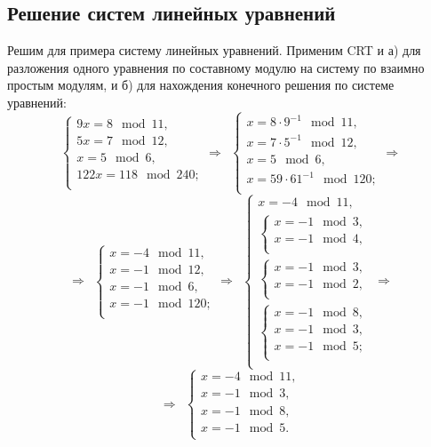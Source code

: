 \subsection[Решение систем линейных уравнений]{Решение систем линейных уравнений}

\example
Решим для примера систему линейных уравнений. Применим CRT и а) для разложения одного уравнения по составному модулю на систему по взаимно простым модулям, и б) для нахождения конечного решения по системе уравнений:
\[
    \begin{cases}
        9 x = 8 \mod 11, \\
        5 x = 7 \mod 12, \\
        x = 5 \mod 6, \\
        122 x = 118 \mod 240; \\
    \end{cases}
    \Rightarrow ~~
    \begin{cases}
        x = 8 \cdot 9^{-1} \mod 11, \\
        x = 7 \cdot 5^{-1} \mod 12, \\
        x = 5 \mod 6, \\
        x = 59 \cdot 61^{-1} \mod 120; \\
    \end{cases}
    \Rightarrow
\] \[
    \Rightarrow ~~
    \begin{cases}
        x = -4 \mod 11, \\
        x = -1 \mod 12, \\
        x = -1 \mod 6, \\
        x = -1 \mod 120; \\
    \end{cases}
    \Rightarrow ~~
    \begin{cases}
        x = -4 \mod 11, \\
        \begin{cases}
            x = -1 \mod 3, \\
            x = -1 \mod 4, \\
        \end{cases} \\
        \begin{cases}
            x = -1 \mod 3, \\
            x = -1 \mod 2, \\
        \end{cases} \\
        \begin{cases}
            x = -1 \mod 8, \\
            x = -1 \mod 3, \\
            x = -1 \mod 5; \\
        \end{cases} \\
    \end{cases}
    \Rightarrow
\] \[
    \Rightarrow ~~
    \begin{cases}
        x = -4 \mod 11, \\
        x = -1 \mod 3, \\
        x = -1 \mod 8, \\
        x = -1 \mod 5. \\
    \end{cases}
\]
